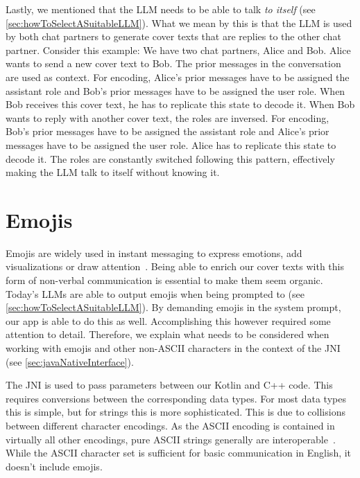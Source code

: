 Lastly, we mentioned that the \gls{LLM} needs to be able to talk \textit{to itself} (see \cref{sec:howToSelectASuitableLLM}). What we mean by this is that the \gls{LLM} is used by both chat partners to generate cover texts that are replies to the other chat partner. Consider this example: We have two chat partners, Alice and Bob. Alice wants to send a new cover text to Bob. The prior messages in the conversation are used as context. For encoding, Alice's prior messages have to be assigned the assistant role and Bob's prior messages have to be assigned the user role. When Bob receives this cover text, he has to replicate this state to decode it. When Bob wants to reply with another cover text, the roles are inversed. For encoding, Bob's prior messages have to be assigned the assistant role and Alice's prior messages have to be assigned the user role. Alice has to replicate this state to decode it. The roles are constantly switched following this pattern, effectively making the \gls{LLM} talk to itself without knowing it.

\section{Emojis}
\label{sec:emojis}
Emojis are widely used in instant messaging to express emotions, add visualizations or draw attention~\cite{zhouGoodbyeTextHello2017}. Being able to enrich our cover texts with this form of non-verbal communication is essential to make them seem organic. Today's \glspl{LLM} are able to output emojis when being prompted to (see \cref{sec:howToSelectASuitableLLM}). By demanding emojis in the system prompt, our app is able to do this as well. Accomplishing this however required some attention to detail. Therefore, we explain what needs to be considered when working with emojis and other non-ASCII characters in the context of the \gls{JNI} (see \cref{sec:javaNativeInterface}).

The \gls{JNI} is used to pass parameters between our Kotlin and C++ code. This requires conversions between the corresponding data types. For most data types this is simple, but for strings this is more sophisticated. This is due to collisions between different character encodings. As the ASCII encoding is contained in virtually all other encodings, pure ASCII strings generally are interoperable~\cite{gleaveMakingCompressionAlgorithms2017}. While the ASCII character set is sufficient for basic communication in English, it doesn't include emojis.

